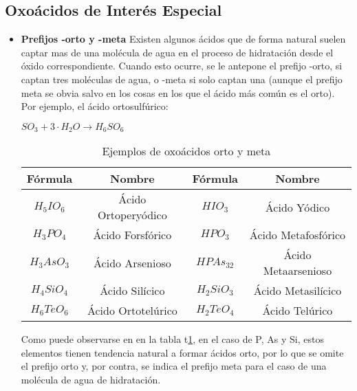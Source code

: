 \subsection{Oxoácidos de Interés Especial}

\begin{itemize}
	\item \textbf{Prefijos -orto y -meta} Existen algunos ácidos que de forma natural suelen captar mas de una molécula de agua en el proceso de hidratación desde el óxido correspondiente. Cuando esto ocurre, se le antepone el prefijo -orto, si captan tres moléculas de agua, o -meta si solo captan una (aunque el prefijo meta se obvia salvo en los cosas en los que el ácido más común es el orto). Por ejemplo, el ácido ortosulfúrico:
	\begin{center}
		$SO_3 + 3\cdot H_{2}O \rightarrow  H_{6}SO_{6}$
	\end{center}
	\begin{table}[h!]
		\centering
		\begin{tabular}{c|c|c|c}
			Fórmula&Nombre&Fórmula&Nombre\\ \hline
			$H_{5}IO_{6}$&Ácido Ortoperyódico&$HIO_{3}$&Ácido Yódico\\
			$H_{3}PO_{4}$&Ácido Forsfórico&$HPO_{3}$&Ácido Metafosfórico\\
			$H_{3}AsO_{3}$&Ácido Arsenioso&$HPAs_{32}$&Ácido Metaarsenioso\\
			$H_{4}SiO_{4}$&Ácido Silícico&$H_{2}SiO_{3}$&Ácido Metasilícico\\
			$H_{6}TeO_{6}$&Ácido Ortotelúrico&$H_{2}TeO_{4}$&Ácido Telúrico\\ \hline
		\end{tabular}
		\caption{Ejemplos de oxoácidos orto y meta}
		\label{tab:orto}
	\end{table}
	Como puede observarse en en la tabla t\ref{tab:orto}, en el caso de P, As y Si, estos elementos tienen tendencia natural a formar ácidos orto, por lo que se omite el prefijo orto y, por contra, se indica el prefijo meta para el caso de una molécula de agua de hidratación.\\
	

\end{itemize}

